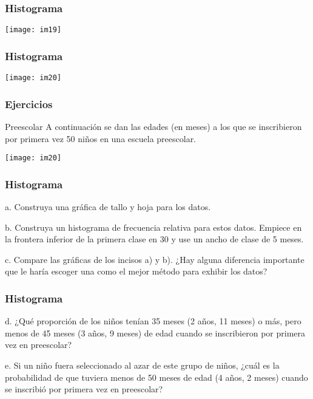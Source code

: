 \documentclass[spanish]{beamer}
\begin{document}
\begin{frame}
\frametitle{Histograma}
\begin{center}
\texttt{[image: im19]}
\end{center}
\end{frame}
\begin{frame}
\frametitle{Histograma}
\begin{center}
\texttt{[image: im20]}
\end{center}
\end{frame}
\begin{frame}
\frametitle{Ejercicios}
Preescolar A continuación se dan las
edades (en meses) a los que se inscribieron por
primera vez 50 niños en una escuela preescolar.
\begin{center}
\texttt{[image: im20]}
\end{center}
\end{frame}
\begin{frame}
\frametitle{Histograma}
a. Construya una gráfica de tallo y hoja para los datos.

b. Construya un histograma de frecuencia relativa para
estos datos. Empiece en la frontera inferior de la
primera clase en 30 y use un ancho de clase de 5 meses.

c. Compare las gráficas de los incisos a) y b). ¿Hay
alguna diferencia importante que le haría escoger una
como el mejor método para exhibir los datos?
\end{frame}
\begin{frame}
\frametitle{Histograma}
d. ¿Qué proporción de los niños tenían 35 meses
(2 años, 11 meses) o más, pero menos de 45 meses
(3 años, 9 meses) de edad cuando se inscribieron
por primera vez en preescolar?

e. Si un niño fuera seleccionado al azar de este grupo de
niños, ¿cuál es la probabilidad de que tuviera menos
de 50 meses de edad (4 años, 2 meses) cuando se
inscribió por primera vez en preescolar?
\end{frame}
\end{document}
